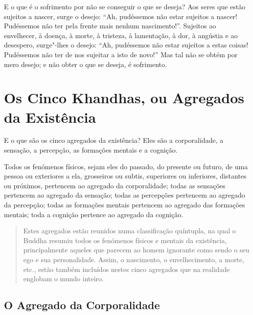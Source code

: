 E o que é o sofrimento por não se conseguir o que se deseja? Aos seres que estão
sujeitos a nascer, surge o desejo: “Ah, pudéssemos não estar sujeitos a nascer!
Pudéssemos não ter pela frente mais nenhum nascimento!”. Sujeitos ao
envelhecer, à doença, à morte, à tristeza, à lamentação, à dor, à angústia e ao
desespero, surge"-lhes o desejo: “Ah, pudéssemos não estar sujeitos a estas
coisas! Pudéssemos não ter de nos sujeitar a isto de novo!” Mas tal não se
obtém por mero desejo; e não obter o que se deseja, é sofrimento.


\clearpage

\section{Os Cinco Khandhas, ou Agregados da Existência}


E o que são os cinco agregados da existência? Eles são a corporalidade, a
sensação, a percepção, as formações mentais e a cognição.


Todos os fenómenos físicos, sejam eles do passado, do presente ou futuro, de uma
pessoa ou exteriores a ela, grosseiros ou subtis, superiores ou inferiores,
distantes ou próximos, pertencem ao agregado da corporalidade; todas as
sensações pertencem ao agregado da sensação; todas as percepções pertencem ao
agregado da percepção; todas as formações mentais pertencem ao agregado das
formações mentais; toda a cognição pertence ao agregado da cognição.


\begin{quote}
  Estes agregados estão reunidos numa classificação quíntupla, na qual o Buddha
  resumiu todos os fenómenos físicos e mentais da existência, principalmente
  aqueles que parecem ao homem ignorante como sendo o seu ego e sua
  personalidade. Assim, o nascimento, o envelhecimento, a morte, etc., estão
  também incluídos nestes cinco agregados que na realidade englobam o mundo
  inteiro.
\end{quote}

\clearpage

\subsection{O Agregado da Corporalidade}

